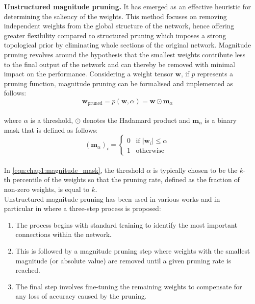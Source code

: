 \noindent\textbf{Unstructured magnitude pruning.} It has emerged as an effective
heuristic for determining the saliency of the weights. This method focuses on
removing independent weights from the global structure of the network, hence
offering greater flexibility compared to structured pruning which imposes a
strong topological prior by eliminating whole sections of the original network.
Magnitude pruning revolves around the hypothesis that the smallest weights
contribute less to the final output of the network and can thereby be removed
with minimal impact on the performance. Considering a weight tensor
$\mathbf{w}$, if $p$ represents a pruning function, magnitude pruning can be
formalised and implemented as follows:\\

\begin{equation}
  \label{eqn:chap1:magnitude_pruning}
  \mathbf{w}_{\text{pruned}} = p(\mathbf{w}, \alpha) = \mathbf{w} \odot \mathbf{m}_\alpha
\end{equation}\\

\noindent where $\alpha$ is a threshold, $\odot$ denotes the Hadamard product and
$\mathbf{m}_\alpha$ is a binary mask that is defined as follows:\\

\begin{equation}
  \label{eqn:chap1:magnitude_mask}
  (\mathbf{m}_\alpha)_i = \begin{cases}
  0 & \text{if } |\mathbf{w}_i| \leq \alpha \\
    1 & \text{otherwise}
  \end{cases}
\end{equation}\\

\noindent In \cref{eqn:chap1:magnitude_mask}, the threshold $\alpha$ is
typically chosen to be the $k$-th percentile of the weights so that the pruning
rate, defined as the fraction of non-zero weights, is equal to $k$.\\

Unstructured magnitude pruning has been used in various works and in particular
in \cite{DBLP:conf/nips/HanPTD15} where a three-step process is proposed:\\

\begin{enumerate}
  \item The process begins with standard training to identify the most important
  connections within the network.
  \item This is followed by a magnitude pruning step where weights with the
  smallest magnitude (or absolute value) are removed until a given pruning rate
  is reached.
  \item The final step involves fine-tuning the remaining weights to compensate
  for any loss of accuracy caused by the pruning.\\
\end{enumerate}

